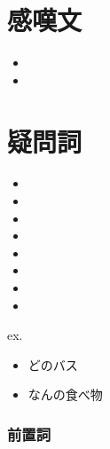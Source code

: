 \documentclass[10pt]{jsarticle}
\newcommand{\answer}[2]{{\color{orange}#2}}
\newcommand{\answer}[2]{\vspace{#1mm}}
\begin{document}
\section{感嘆文}
\begin{screen}
  \begin{itemize}
    \item  \answer{5}{}
    \item  \answer{5}{}
  \end{itemize}
\end{screen}
\section{疑問詞}
\begin{screen}
  \begin{multicols}{4}
    \begin{itemize}
      \item  \answer{5}{}
      \item  \answer{5}{}
      \item  \answer{5}{}
      \item  \answer{5}{}
      \item  \answer{5}{}
      \item  \answer{5}{}
      \item  \answer{5}{}
      \item  \answer{5}{}
    \end{itemize}
  \end{multicols}
  ex.
  \begin{multicols}{2}
    \begin{itemize}
      \item どのバス \answer{5}{}
      \item なんの食べ物 \answer{5}{}
    \end{itemize}
  \end{multicols}
\end{screen}

\newpage

\subsubsection*{前置詞}
\end{document}
